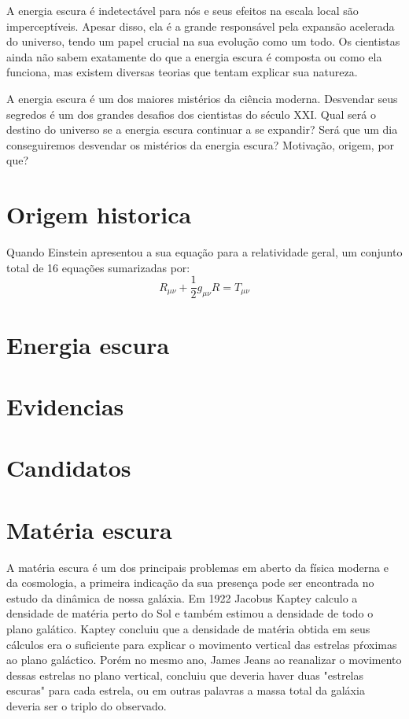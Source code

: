 \documentclass[
	article,			%
	11pt,				%
	oneside,			%
	a4paper,			%
	english,			%
	brazil,				%
	sumario=tradicional
	]{abntex2}
\begin{document}
A energia escura é indetectável para nós e seus efeitos na escala local são imperceptíveis. Apesar disso, ela é a grande responsável pela expansão acelerada do universo, tendo um papel crucial na sua evolução como um todo. Os cientistas ainda não sabem exatamente do que a energia escura é composta ou como ela funciona, mas existem diversas teorias que tentam explicar sua natureza.

A energia escura é um dos maiores mistérios da ciência moderna. Desvendar seus segredos é um dos grandes desafios dos cientistas do século XXI. Qual será o destino do universo se a energia escura continuar a se expandir? Será que um dia conseguiremos desvendar os mistérios da energia escura?
Motivação, origem, por que?
\section{Origem historica}
Quando Einstein apresentou a sua equação para a relatividade geral, um conjunto total de 16 equações sumarizadas por:
\begin{equation}
	R_{\mu \nu}+\frac{1}{2}g_{\mu \nu} R = T_{\mu \nu}
\end{equation}
\section{Energia escura}

\section{Evidencias}
\section{Candidatos}

\section{Matéria escura}

A matéria escura é um dos principais problemas em aberto da física moderna e da cosmologia, a primeira indicação da sua presença
pode ser encontrada no estudo da dinâmica de nossa galáxia. Em 1922 Jacobus Kaptey calculo a densidade
de matéria perto do Sol e também estimou a densidade de todo o plano galático\cite{1922ApJ55302K}. Kaptey concluiu que a densidade
de matéria obtida em seus cálculos era o suficiente para explicar o movimento vertical das estrelas pŕoximas ao plano galáctico. Porém no mesmo ano, James Jeans
ao reanalizar o movimento dessas estrelas no plano vertical, concluiu que deveria haver duas "estrelas escuras" para cada estrela\cite{10.1093/mnras/82.3.122}, ou em outras palavras a massa total 
da galáxia deveria ser o triplo do observado.
\end{document}
